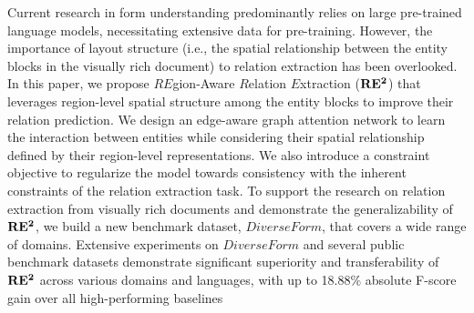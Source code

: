 Current research in form understanding predominantly relies on large pre-trained language models, necessitating extensive data for pre-training. However, the importance of layout structure (i.e., the spatial relationship between the entity blocks in the visually rich document) to relation extraction has been overlooked. In this paper, we propose ${RE}$gion-Aware ${R}$elation ${E}$xtraction ($\bf{RE^2}$) that leverages region-level spatial structure among the entity blocks to improve their relation prediction. We design an edge-aware graph attention network to learn the interaction between entities while considering their spatial relationship defined by their region-level representations. We also introduce a constraint objective to regularize the model towards consistency with the inherent constraints of the relation extraction task. To support the research on relation extraction from visually rich documents and demonstrate the generalizability of $\bf{RE^2}$, we build a new benchmark dataset, ${DiverseForm}$, that covers a wide range of domains. Extensive experiments on ${DiverseForm}$ and several public benchmark datasets demonstrate significant superiority and transferability of $\bf{RE^2}$ across various domains and languages, with up to 18.88\% absolute F-score gain over all high-performing baselines